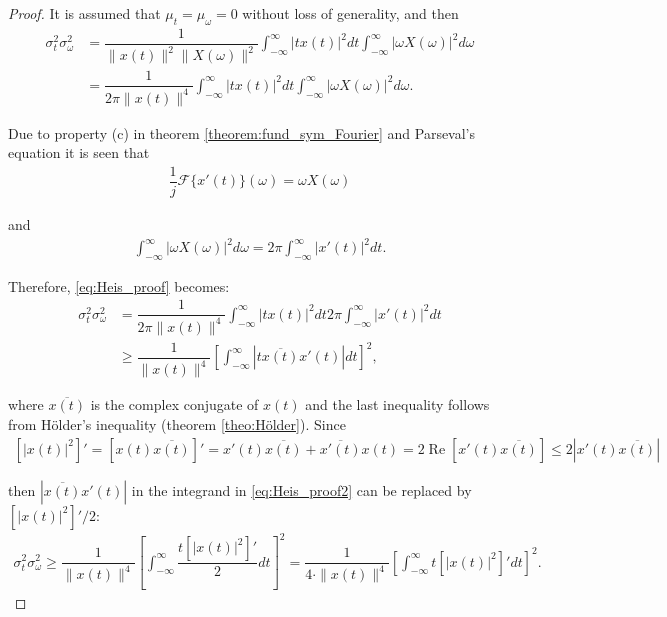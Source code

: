 \begin{proof}
It is assumed that $\mu_t = \mu_\omega = 0$ without loss of generality, and then
\begin{align} \label{eq:Heis_proof}
\sigma_t^2 \sigma_\omega^2 &= \dfrac{1}{\|x(t)\|^2 \|X(\omega)\|^2} \int_{-\infty}^\infty |tx(t)|^2 dt \int_{-\infty}^\infty |\omega X(\omega)|^2 d\omega \nonumber \\
&= \dfrac{1}{2\pi\|x(t)\|^4} \int_{-\infty}^\infty |tx(t)|^2 dt \int_{-\infty}^\infty |\omega X(\omega)|^2 d\omega.
\end{align}

Due to property (c) in theorem \ref{theorem:fund_sym_Fourier} and Parseval's equation it is seen that
\begin{align*}
\dfrac{1}{j} \mathcal{F}\{x'(t)\}(\omega) = \omega X(\omega)
\end{align*}

and
\begin{align*}
\int_{-\infty}^\infty |\omega X(\omega)|^2 d\omega = 2\pi \int_{-\infty}^\infty |x'(t)|^2 dt.
\end{align*}

Therefore, \eqref{eq:Heis_proof} becomes:
\begin{align} \label{eq:Heis_proof2}
\sigma_t^2 \sigma_\omega^2 &= \dfrac{1}{2\pi \|x(t)\|^4} \int_{-\infty}^\infty |tx(t)|^2 dt 2\pi \int_{-\infty}^\infty | x'(t)|^2 dt \nonumber \\
&\geq \dfrac{1}{\|x(t)\|^4} \left[ \int_{-\infty}^\infty \left| t \overline{x(t)} x'(t) \right| dt \right]^2,
\end{align}

where $\overline{x(t)}$ is the complex conjugate of $x(t)$ and the last inequality follows from Hölder's inequality (theorem \ref{theo:Hölder}). Since
\begin{align*}
\left[ |x(t)|^2 \right]' = \left[ x(t) \overline{x(t)} \right]' = x'(t) \overline{x(t)} + \overline{x'(t)} x(t) = 2 \operatorname{Re} \left[ x'(t) \overline{x(t)} \right] \leq 2 \left| x'(t) \overline{x(t)} \right|
\end{align*}

then $\left| \overline{x(t)} x'(t) \right|$ in the integrand in \eqref{eq:Heis_proof2} can be replaced by $\left[ |x(t)|^2 \right]'/2$:
\begin{align} \label{eq:Heis_proof3}
\sigma_t^2 \sigma_\omega^2 \geq \dfrac{1}{\|x(t)\|^4} \left[ \int_{-\infty}^\infty \dfrac{t \left[ |x(t)|^2 \right]'}{2} dt \right]^2 = \dfrac{1}{4 \cdot \|x(t)\|^4} \left[ \int_{-\infty}^\infty t \left[ |x(t)|^2 \right]' dt \right]^2.
\end{align}


\end{proof}
